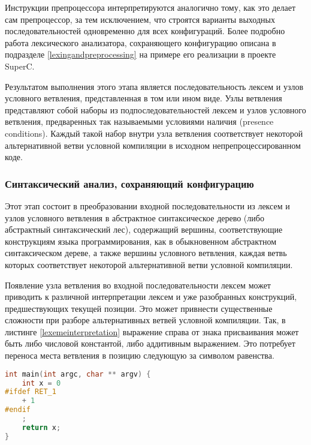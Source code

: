 Инструкции препроцессора интерпретируются аналогично тому, как это делает сам препроцессор, за тем исключением, что строятся варианты выходных последовательностей одновременно для всех конфигураций. Более подробно работа лексического анализатора, сохраняющего конфигурацию описана в подразделе \ref{lexingandpreprocessing} на примере его реализации в проекте SuperC.

Результатом выполнения этого этапа является последовательность лексем и узлов условного ветвления, представленная в том или ином виде. Узлы ветвления представляют собой наборы из подпоследовательностей лексем и узлов условного ветвления, предваренных так называемыми условиями наличия (presence conditions). Каждый такой набор внутри узла ветвления соответствует некоторой альтернативной ветви условной компиляции в исходном непрепроцессированном коде.

\subsubsection{Синтаксический анализ, сохраняющий конфигурацию}

Этот этап состоит в преобразовании входной последовательности из лексем и узлов условного ветвления в абстрактное синтаксическое дерево (либо абстрактный синтаксический лес), содержащий вершины, соответствующие конструкциям языка программирования, как в обыкновенном абстрактном синтаксическом дереве, а также вершины условного ветвления, каждая ветвь которых соответствует некоторой альтернативной ветви условной компиляции.

Появление узла ветвления во входной последовательности лексем может приводить к различной интерпретации лексем и уже разобранных конструкций, предшествующих текущей позиции. Это может привнести существенные сложности при разборе альтернативных ветвей условной компиляции. Так, в листинге \ref{lexemeinterpretation} выражение справа от знака присваивания может быть либо числовой константой, либо аддитивным выражением. Это потребует переноса места ветвления в позицию следующую за символом равенства.

\begin{minipage}{\linewidth}
\begin{lstlisting}[caption={Пример различной интерпретации лексем, предшестующих блоку условной компиляции},label=lexemeinterpretation,language=C]
int main(int argc, char ** argv) {
	int x = 0
#ifdef RET_1
	+ 1	
#endif
	;
	return x;	
}
\end{lstlisting}
\end{minipage}

